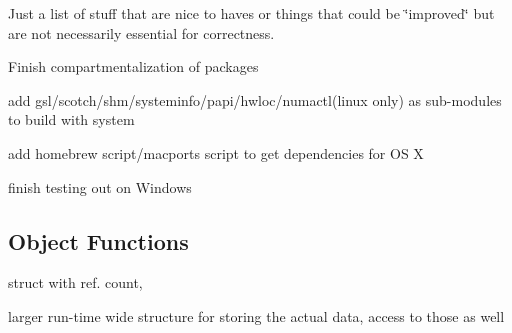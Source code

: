 Just a list of stuff that are nice to haves or things that could be \char`\"{}improved\char`\"{} but are not necessarily essential for correctness.


\begin{DoxyItemize}
\item Finish compartmentalization of packages
\item add gsl/scotch/shm/systeminfo/papi/hwloc/numactl(linux only) as sub-\/modules to build with system
\item add homebrew script/macports script to get dependencies for OS X
\item finish testing out on Windows
\end{DoxyItemize}

\subsection*{Object Functions}


\begin{DoxyItemize}
\item struct with ref. count,
\item larger run-\/time wide structure for storing the actual data, access to those as well
\item 
\end{DoxyItemize}